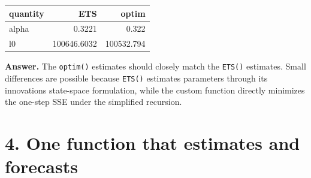 \documentclass[
  11pt,
]{article}
\newenvironment{Shaded}{\begin{snugshade}}{\end{snugshade}}
\newcommand{\AttributeTok}[1]{\textcolor[rgb]{0.13,0.29,0.53}{#1}}
\newcommand{\ConstantTok}[1]{\textcolor[rgb]{0.56,0.35,0.01}{#1}}
\newcommand{\DecValTok}[1]{\textcolor[rgb]{0.00,0.00,0.81}{#1}}
\newcommand{\FloatTok}[1]{\textcolor[rgb]{0.00,0.00,0.81}{#1}}
\newcommand{\FunctionTok}[1]{\textcolor[rgb]{0.13,0.29,0.53}{\textbf{#1}}}
\newcommand{\NormalTok}[1]{#1}
\newcommand{\OtherTok}[1]{\textcolor[rgb]{0.56,0.35,0.01}{#1}}
\newcommand{\SpecialCharTok}[1]{\textcolor[rgb]{0.81,0.36,0.00}{\textbf{#1}}}
\newcommand{\StringTok}[1]{\textcolor[rgb]{0.31,0.60,0.02}{#1}}
\newcounter{none} %
\begin{document}
\begin{Shaded}
\end{Shaded}

{\def\LTcaptype{none} %
\begin{longtable}[]{@{}lrr@{}}
\toprule\noalign{}
quantity & ETS & optim \\
\midrule\noalign{}
\endhead
\bottomrule\noalign{}
\endlastfoot
alpha & 0.3221 & 0.322 \\
l0 & 100646.6032 & 100532.794 \\
\end{longtable}
}

\textbf{Answer.} The \texttt{optim()} estimates should closely match the
\texttt{ETS()} estimates. Small differences are possible because
\texttt{ETS()} estimates parameters through its innovations state-space
formulation, while the custom function directly minimizes the one-step
SSE under the simplified recursion.

\section{4. One function that estimates and
forecasts}\label{one-function-that-estimates-and-forecasts}
\end{document}
